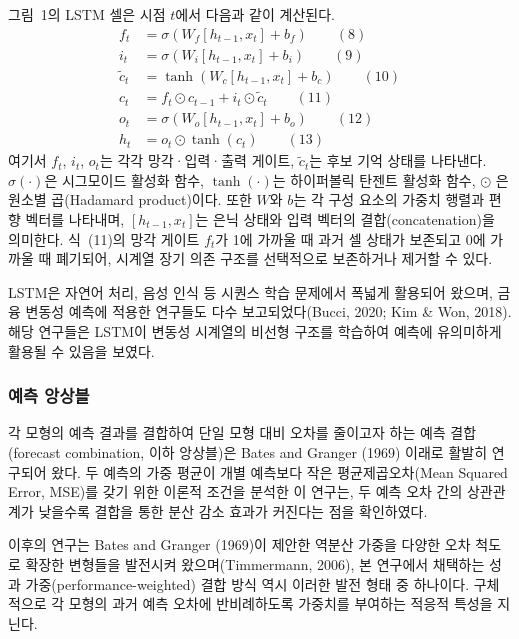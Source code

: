 \documentclass{article}
\begin{document}
그림~1의 LSTM 셀은 시점 $t$에서 다음과 같이 계산된다.
\begin{align}
f_t &= \sigma(W_f [h_{t-1}, x_t] + b_f) \qquad(8)\\
i_t &= \sigma(W_i [h_{t-1}, x_t] + b_i) \qquad(9)\\
\tilde{c}_t &= \tanh(W_c [h_{t-1}, x_t] + b_c) \qquad(10)\\
c_t &= f_t \odot c_{t-1} + i_t \odot \tilde{c}_t \qquad(11)\\
o_t &= \sigma(W_o [h_{t-1}, x_t] + b_o) \qquad(12)\\
h_t &= o_t \odot \tanh(c_t) \qquad(13)\end{align}
여기서 $f_t$, $i_t$, $o_t$는 각각 망각·입력·출력 게이트, $\tilde{c}_t$는 후보 기억 상태를 나타낸다. $\sigma(\cdot)$은 시그모이드 활성화 함수, $\tanh(\cdot)$는 하이퍼볼릭 탄젠트 활성화 함수, $\odot$ 은 원소별 곱(Hadamard product)이다. 또한 \(W\)와 \(b\)는 각 구성 요소의 가중치 행렬과 편향 벡터를 나타내며, \([h_{t-1}, x_t]\)는 은닉 상태와 입력 벡터의 결합(concatenation)을 의미한다. 식~(11)의 망각 게이트 $f_t$가 1에 가까울 때 과거 셀 상태가 보존되고 0에 가까울 때 폐기되어, 시계열 장기 의존 구조를 선택적으로 보존하거나 제거할 수 있다.

LSTM은 자연어 처리, 음성 인식 등 시퀀스 학습 문제에서 폭넓게 활용되어 왔으며, 금융 변동성 예측에 적용한 연구들도 다수 보고되었다(Bucci, 2020; Kim & Won, 2018). 해당 연구들은 LSTM이 변동성 시계열의 비선형 구조를 학습하여 예측에 유의미하게 활용될 수 있음을 보였다.

\subsubsection{예측 앙상블}
\label{subsubsec:ens_review}

각 모형의 예측 결과를 결합하여 단일 모형 대비 오차를 줄이고자 하는 예측 결합(forecast combination, 이하 앙상블)은 Bates and Granger (1969) 이래로 활발히 연구되어 왔다. 두 예측의 가중 평균이 개별 예측보다 작은 평균제곱오차(Mean Squared Error, MSE)를 갖기 위한 이론적 조건을 분석한 이 연구는, 두 예측 오차 간의 상관관계가 낮을수록 결합을 통한 분산 감소 효과가 커진다는 점을 확인하였다.

이후의 연구는 Bates and Granger (1969)이 제안한 역분산 가중을 다양한 오차 척도로 확장한 변형들을 발전시켜 왔으며(Timmermann, 2006), 본 연구에서 채택하는 성과 가중(performance-weighted) 결합 방식 역시 이러한 발전 형태 중 하나이다. 구체적으로 각 모형의 과거 예측 오차에 반비례하도록 가중치를 부여하는 적응적 특성을 지닌다.
\end{document}
